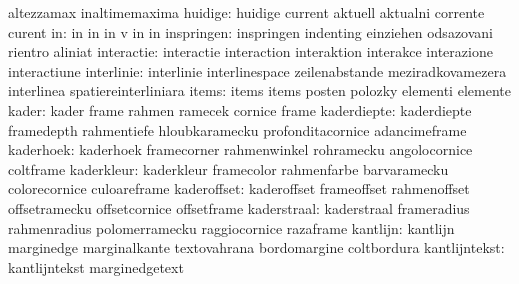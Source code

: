                            altezzamax                inaltimemaxima
                  huidige: huidige                   current
                           aktuell                   aktualni
                           corrente                  curent
                       in: in                        in
                           in                        v
                           in                        in
               inspringen: inspringen                indenting
                           einziehen                 odsazovani
                           rientro                   aliniat
               interactie: interactie                interaction
                           interaktion               interakce
                           interazione               interactiune
               interlinie: interlinie                interlinespace
                           zeilenabstande            meziradkovamezera
                           interlinea                spatiereinterliniara
                    items: items                     items
                           posten                    polozky
                           elementi                  elemente
                    kader: kader                     frame
                           rahmen                    ramecek
                           cornice                   frame
              kaderdiepte: kaderdiepte               framedepth
                           rahmentiefe               hloubkaramecku
                           profonditacornice         adancimeframe
                kaderhoek: kaderhoek                 framecorner
                           rahmenwinkel              rohramecku
                           angolocornice             coltframe
               kaderkleur: kaderkleur                framecolor
                           rahmenfarbe               barvaramecku
                           colorecornice             culoareframe
              kaderoffset: kaderoffset               frameoffset
                           rahmenoffset              offsetramecku
                           offsetcornice             offsetframe
              kaderstraal: kaderstraal               frameradius
                           rahmenradius              polomerramecku
                           raggiocornice             razaframe
                 kantlijn: kantlijn                  marginedge
                           marginalkante             textovahrana
                           bordomargine              coltbordura
            kantlijntekst: kantlijntekst             marginedgetext
